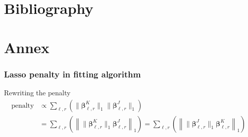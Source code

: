 \documentclass{beamer}
\begin{document}
\section*{Bibliography}
\begin{frame}
\sectionpage
\end{frame}


\begin{frame}[allowframebreaks] 
    
     
    \end{frame}

    \section*{Annex}
\begin{frame}
\sectionpage
\end{frame}

\begin{frame}
    \frametitle{Lasso penalty in fitting algorithm}
    \begin{block}{Rewriting the penalty}
    \begin{align}
        \text{penalty} &\propto \sum\limits_{\ell,r} \left( \lVert \bm{\beta}_{\ell,r}^K \rVert_1 \lVert \bm{\beta}_{\ell,r}^J \rVert_1 \right)\\
        &= \sum\limits_{\ell,r} \left( \left\lVert  \lVert\bm{\beta}_{\ell,r}^K \rVert_1  \bm{\beta}_{\ell,r}^J \right\rVert_1 \right)  = \sum\limits_{\ell,r} \left( \left\lVert  \lVert\bm{\beta}_{\ell,r}^J \rVert_1  \bm{\beta}_{\ell,r}^K \right\rVert_1  \right)
    \end{align}
\end{block}
\end{frame}
\end{document}
